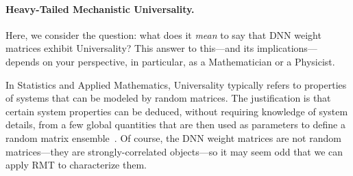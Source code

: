 

\paragraph{Heavy-Tailed Mechanistic Universality.} 


Here, we consider the question:
what does it \emph{mean} to say that DNN weight matrices exhibit Universality? 
This answer to this---and its implications---depends on your perspective, in particular, as a Mathematician or a Physicist.

In Statistics and Applied Mathematics, Universality typically refers to properties of systems that can be modeled by random matrices.
The justification is that certain system properties can be deduced, without requiring knowledge of system details, from a few global quantities that are then used as parameters to define a random matrix ensemble~\cite{ER05,EW13}.
Of course, the DNN weight matrices are not random matrices---they are strongly-correlated objects---so it may seem odd that we can apply RMT to characterize them.

